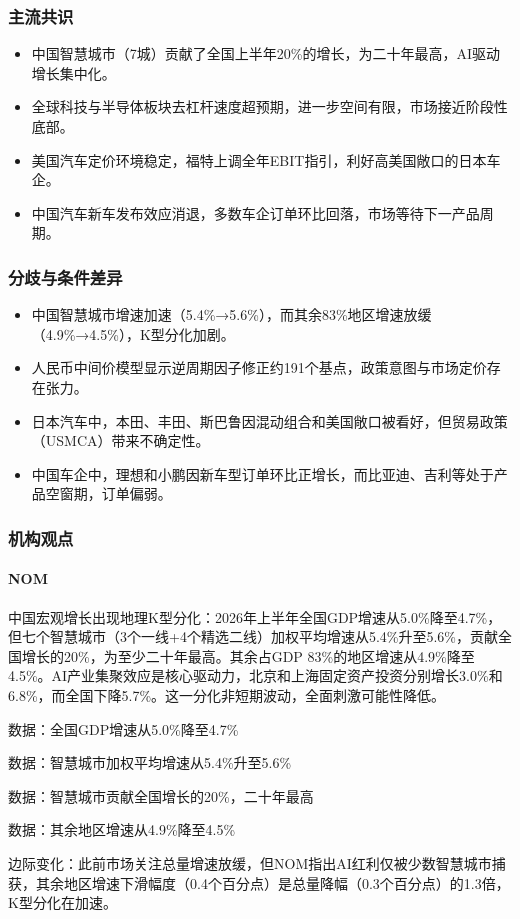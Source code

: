 \documentclass[11pt]{ctexart}
\begin{document}
\subsubsection*{主流共识}
\begin{itemize}
  \item 中国智慧城市（7城）贡献了全国上半年20\%的增长，为二十年最高，AI驱动增长集中化。
  \item 全球科技与半导体板块去杠杆速度超预期，进一步空间有限，市场接近阶段性底部。
  \item 美国汽车定价环境稳定，福特上调全年EBIT指引，利好高美国敞口的日本车企。
  \item 中国汽车新车发布效应消退，多数车企订单环比回落，市场等待下一产品周期。
\end{itemize}
\subsubsection*{分歧与条件差异}
\begin{itemize}
  \item 中国智慧城市增速加速（5.4\%→5.6\%），而其余83\%地区增速放缓（4.9\%→4.5\%），K型分化加剧。
  \item 人民币中间价模型显示逆周期因子修正约191个基点，政策意图与市场定价存在张力。
  \item 日本汽车中，本田、丰田、斯巴鲁因混动组合和美国敞口被看好，但贸易政策（USMCA）带来不确定性。
  \item 中国车企中，理想和小鹏因新车型订单环比正增长，而比亚迪、吉利等处于产品空窗期，订单偏弱。
\end{itemize}
\subsubsection*{机构观点}
\paragraph{NOM} 中国宏观增长出现地理K型分化：2026年上半年全国GDP增速从5.0\%降至4.7\%，但七个智慧城市（3个一线+4个精选二线）加权平均增速从5.4\%升至5.6\%，贡献全国增长的20\%，为至少二十年最高。其余占GDP 83\%的地区增速从4.9\%降至4.5\%。AI产业集聚效应是核心驱动力，北京和上海固定资产投资分别增长3.0\%和6.8\%，而全国下降5.7\%。这一分化非短期波动，全面刺激可能性降低。
{\small\color{refgray}数据：全国GDP增速从5.0\%降至4.7\%\par}
{\small\color{refgray}数据：智慧城市加权平均增速从5.4\%升至5.6\%\par}
{\small\color{refgray}数据：智慧城市贡献全国增长的20\%，二十年最高\par}
{\small\color{refgray}数据：其余地区增速从4.9\%降至4.5\%\par}
{\small\color{refgray}边际变化：此前市场关注总量增速放缓，但NOM指出AI红利仅被少数智慧城市捕获，其余地区增速下滑幅度（0.4个百分点）是总量降幅（0.3个百分点）的1.3倍，K型分化在加速。\par}
\end{document}
